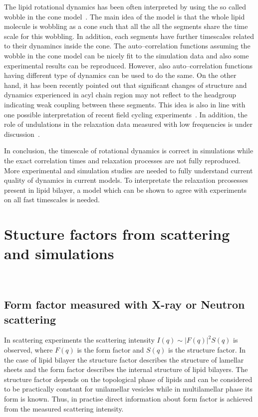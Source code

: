 \documentclass[aps,prl,superscriptaddress,twocolumn]{revtex4}
\begin{document}
The lipid rotational dynamics has been often interpreted by using the so called wobble in the cone model~\cite{pastor88,pastor02,klauda08a,klauda08c,sivanandam09}.
The main idea of the model is that the whole lipid molecule is wobbling as a cone such that all the
all the segments share the time scale for this wobbling. In addition, each segments have further timescales
related to their dynamincs inside the cone. The auto--correlation functions assuming the wobble in the cone
model can be nicely fit to the simulation data and also some experimental results can be reproduced. 
However, also auto--correlation functions having different type of dynamics can be used to do the same.
On the other hand, it has been recently pointed out that significant changes of structure and dynamics 
experienced in acyl chain region may not reflect to the headgroup~\cite{ferreiraTHESIS,botan15} indicating weak coupling 
between these segments. This idea is also in line with one possible interpretation of recent field cycling experiments~\cite{roberts09}.
In addition, the role of undulations in the relaxation data measured with low frequencies is under discussion~\cite{leftin11,edholm08,klauda08a,klauda08c}.

In conclusion, the timescale of rotational dynamics is correct in simulations while the exact correlation times
and relaxation processes are not fully reproduced. More experimental and simulation studies are needed 
to fully understand current quality of dynamics in current models. To interpretate the relaxation prcosesses
present in lipid bilayer, a model which can be shown to agree with experiments on all fast timescales is needed.






\section{Stucture factors from scattering and simulations}

 \\[0.1cm]

\subsection{Form factor measured with X-ray or Neutron scattering}

In scattering experiments the scattering intensity $I(q)\sim|F(q)|^2S(q)$ is observed,
where $F(q)$ is the form factor and $S(q)$ is the structure factor. In the case of lipid
bilayer the structure factor describes the structure of lamellar sheets and the form factor
describes the internal structure of lipid bilayers. The structure factor depends on the
topological phase of lipids and can be considered to be practically constant for unilamellar
vesicles while in multilamellar phase its form is known. Thus, in practise direct
information about form factor is achieved from the measured scattering intensity.
\end{document}
